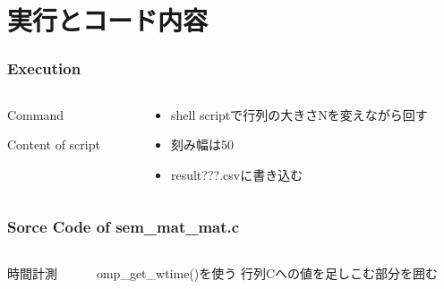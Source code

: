 \documentclass[dvipdfmx]{beamer}
\begin{document}

\section{実行とコード内容}
\begin{frame}
	\frametitle{Execution}
	\begin{columns}
	\begin{column}{0.60\textwidth}
	Command
	
	Content of script
	
	\end{column}
	\begin{column}{0.30\textwidth}
	\begin{itemize}
		\item shell scriptで行列の大きさNを変えながら回す\\
		\item 刻み幅は50\\
		\item result???.csvに書き込む
	\end{itemize}
	\end{column}
	\end{columns}
\end{frame}

\begin{frame}
	\frametitle{Sorce Code of sem\_mat\_mat.c}
	\begin{columns}
	\begin{column}{0.60\textwidth}
		時間計測
		
	\end{column}
	\begin{column}{0.30\textwidth}
		omp\_get\_wtime()を使う
		行列Cへの値を足しこむ部分を囲む
	\end{column}

	\end{columns}
\end{frame}
\end{document}
